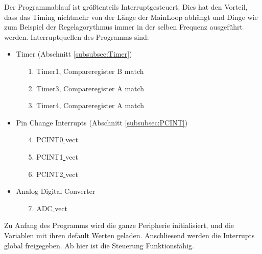 \documentclass[a4paper, 11pt]{report}
\begin{document}
Der Programmablauf ist größtenteils Interruptgesteuert.
			Dies hat den Vorteil, dass das Timing nichtmehr von der Länge der MainLoop abhängt und Dinge wie zum  Beispiel der Regelagorythmus immer in der selben Frequenz ausgeführt werden.
			Interruptquellen des Programms sind:
			\begin{itemize}
				\item Timer  (Abschnitt \ref{subsubsec:Timer})
				\begin{itemize}
					\item[1.] Timer1, Compareregister B match
					\item[2.] Timer3, Compareregister A match
					\item[3.] Timer4, Compareregister A match
				\end{itemize}
				\item Pin Change Interrupts (Abschnitt \ref{subsubsec:PCINT})
				\begin{itemize}
					\item[4.] PCINT0\underline{ }vect
					\item[5.] PCINT1\underline{ }vect
					\item[6.] PCINT2\underline{ }vect
				\end{itemize}
				\item Analog Digital Converter
				\begin{itemize}
					\item[7.] ADC\underline{ }vect
				\end{itemize}

			\end{itemize}
			\newpage
			Zu Anfang des Programms wird die ganze Peripherie initialisiert, und die Variablen mit ihren default Werten geladen.
			Anschliesend werden die Interrupts global freigegeben. Ab hier ist die Steuerung Funktionsfähig.
\end{document}

